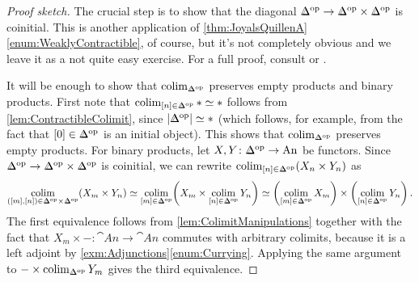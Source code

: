 \begin{proof}[Proof sketch]
	The crucial step is to show that the diagonal $\IDelta^\op\rightarrow \IDelta^\op\times\IDelta^\op$ is coinitial. This is another application of \cref{thm:JoyalsQuillenA}\cref{enum:WeaklyContractible}, of course, but it's not completely obvious and we leave it as a not quite easy exercise. For a full proof, consult \cite[Tag~\href{https://kerodon.net/tag/02QP}{02QP}]{Kerodon} or \cite[Exercise~\href{https://florianadler.github.io/AlgebraBonn/KTheory.pdf\#smallerdummy.2.18.1}{II.18$a$}]{KTheory}.
	
	It will be enough to show that $\colimit_{\IDelta^\op}$ preserves empty products and binary products. First note that $\colimit_{[n]\in \IDelta^\op}*\simeq *$ follows from \cref{lem:ContractibleColimit}, since  $\left|\IDelta^\op\right|\simeq *$ (which follows, for example, from the fact that $[0]\in\IDelta^\op$ is an initial object). This shows that $\colimit_{\IDelta^\op}$ preserves empty products. For binary products, let $X,Y\colon \IDelta^\op\rightarrow\cat{An}$ be functors. Since $\IDelta^\op\rightarrow\IDelta^\op\times\IDelta^\op$ is coinitial, we can rewrite $\colimit_{[n]\in\IDelta^\op}\left(X_n\times Y_n\right)$ as
	\begin{equation*}
		\colimit_{([m],[n])\in \IDelta^\op\times \IDelta^\op}\left(X_m\times Y_n\right)\simeq \colimit_{[m]\in\IDelta^\op}\biggl(X_m\times \colimit_{[n]\in\IDelta^\op}Y_n\biggr)
		\simeq \biggl(\colimit_{[m]\in\IDelta^\op}X_m\biggr)\times \biggl(\colimit_{[n]\in\IDelta^\op}Y_n\biggr)\,.
	\end{equation*}
	The first equivalence follows from \cref{lem:ColimitManipulations} together with the fact that $X_m\times -\colon \cat{An}\rightarrow\cat{An}$ commutes with arbitrary colimits, because it is a left adjoint by \cref{exm:Adjunctions}\cref{enum:Currying}. Applying the same argument to $-\times \colimit_{\IDelta^\op}Y_m$ gives the third equivalence.
\end{proof}
